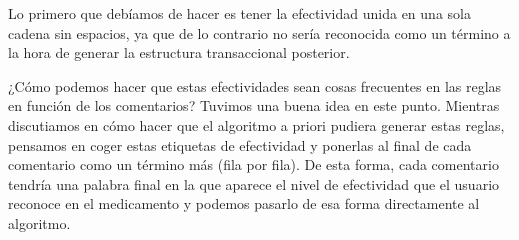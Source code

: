 \documentclass[spanish,]{article}
\newenvironment{Shaded}{\begin{snugshade}}{\end{snugshade}}
\newcommand{\KeywordTok}[1]{\textcolor[rgb]{0.13,0.29,0.53}{\textbf{#1}}}
\newcommand{\StringTok}[1]{\textcolor[rgb]{0.31,0.60,0.02}{#1}}
\newcommand{\CommentTok}[1]{\textcolor[rgb]{0.56,0.35,0.01}{\textit{#1}}}
\newcommand{\OperatorTok}[1]{\textcolor[rgb]{0.81,0.36,0.00}{\textbf{#1}}}
\newcommand{\NormalTok}[1]{#1}
\begin{document}
Lo primero que debíamos de hacer es tener la efectividad unida en una
sola cadena sin espacios, ya que de lo contrario no sería reconocida
como un término a la hora de generar la estructura transaccional
posterior.

\begin{Shaded}
\end{Shaded}

¿Cómo podemos hacer que estas efectividades sean cosas frecuentes en las
reglas en función de los comentarios? Tuvimos una buena idea en este
punto. Mientras discutiamos en cómo hacer que el algoritmo a priori
pudiera generar estas reglas, pensamos en coger estas etiquetas de
efectividad y ponerlas al final de cada comentario como un término más
(fila por fila). De esta forma, cada comentario tendría una palabra
final en la que aparece el nivel de efectividad que el usuario reconoce
en el medicamento y podemos pasarlo de esa forma directamente al
algoritmo.
\end{document}
